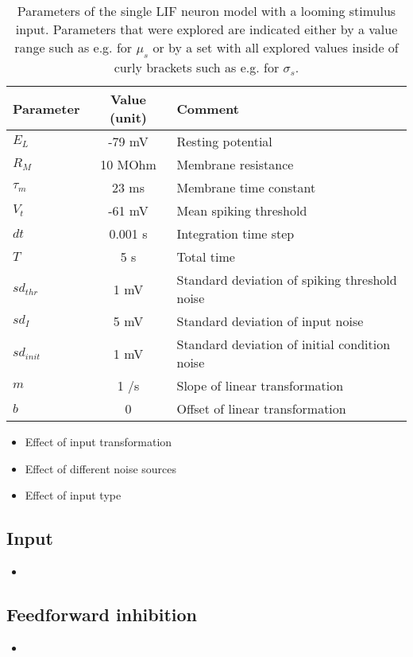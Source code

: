 \documentclass[a4paper,10pt]{scrartcl}
\begin{document}
	\begin{table} [!th]
		\begin{center}
			\begin{tabular}{|l|c|p{7cm}|}
				\hline
				\textbf{Parameter} & \textbf{Value (unit)} & \textbf{Comment} \\
				\hline
				$E_L$ & -79 mV & Resting potential\\
				$R_M$ & 10 MOhm & Membrane resistance\\
				$\tau_{m}$ & 23 ms & Membrane time constant\\
				$V_t$ & -61 mV & Mean spiking threshold\\
				$dt$ & 0.001 s & Integration time step\\
				$T$ & 5 s & Total time\\
				$sd_{thr}$ & 1 mV & Standard deviation of spiking threshold noise\\
				$sd_{I}$ & 5 mV & Standard deviation of input noise\\
				$sd_{init}$ & 1 mV & Standard deviation of initial condition noise\\
				$m$ & 1 \textdegree/s  & Slope of linear transformation\\
				$b$ & 0 \textdegree & Offset of linear transformation\\
				\hline
			\end{tabular}
		\end{center}
		\caption{Parameters of the single LIF neuron model with a looming stimulus input. Parameters that were explored are indicated either by a value range such as e.g. for $\mu_s$ or by a set with all explored values inside of curly brackets such as e.g. for $\sigma_s$.}
		\label{tab:params}
	\end{table}
	\begin{itemize}
		\item Effect of input transformation
		\item Effect of different noise sources
		\item Effect of input type
	\end{itemize}
	\subsection{Input}
	\begin{itemize}
		\item 
	\end{itemize}
	\subsection{Feedforward inhibition}
	\begin{itemize}
		\item 
	\end{itemize}
\end{document}
